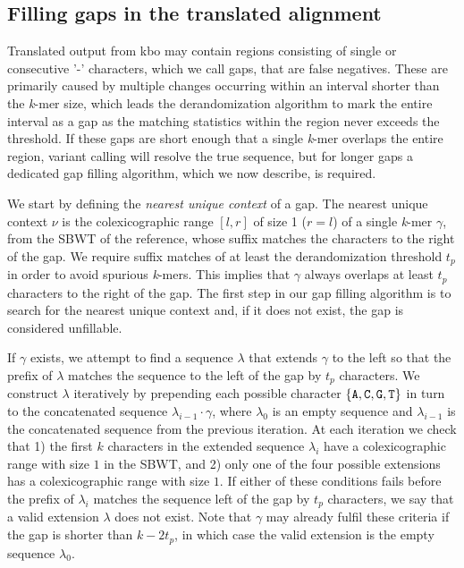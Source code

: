 \documentclass[unnumsec,webpdf,contemporary,large]{oup-authoring-template}%
\theoremstyle{thmstyleone}%
\theoremstyle{thmstyletwo}%
\theoremstyle{thmstylethree}%
\begin{document}
\subsection{Filling gaps in the translated alignment}
Translated output from {\sf kbo} may contain regions consisting of single or consecutive '-' characters, which we call gaps, that are false negatives. These are primarily caused by multiple changes occurring within an interval shorter than the \emph{k}-mer size, which leads the derandomization algorithm to mark the entire interval as a gap as the matching statistics within the region never exceeds the threshold. If these gaps are short enough that a single \emph{k}-mer overlaps the entire region, variant calling will resolve the true sequence, but for longer gaps a dedicated gap filling algorithm, which we now describe, is required.

We start by defining the \textit{nearest unique context} of a gap. %
The nearest unique context $\nu$ is the colexicographic range $\left[l,r\right]$ of size 1  ($r=l$) of a single \emph{k}-mer $\gamma$, from the SBWT of the reference, whose suffix matches the characters to the right of the gap. We require suffix matches of at least the derandomization threshold $t_p$ in order to avoid spurious \emph{k}-mers. This implies that $\gamma$ always overlaps at least $t_p$ characters to the right of the gap. The first step in our gap filling algorithm is to search for the nearest unique context and, if it does not exist, the gap is considered unfillable.

If $\gamma$ exists, we attempt to find a sequence $\lambda$ that extends $\gamma$ to the left so that the prefix of $\lambda$ matches the sequence to the left of the gap by $t_p$ characters. We construct $\lambda$ iteratively by prepending each possible character $\left\{ {\tt A,C,G,T}\right\}$ in turn to the concatenated sequence $\lambda_{i - 1} \cdot \gamma$, where $\lambda_0$ is an empty sequence and $\lambda_{i - 1}$ is the concatenated sequence from the previous iteration. At each iteration we check that 1) the first $k$ characters in the extended sequence $\lambda_i$ have a colexicographic range with size $1$ in the SBWT, and 2) only one of the four possible extensions has a colexicographic range with size $1$. If either of these conditions fails before the prefix of $\lambda_i$ matches the sequence left of the gap by $t_p$ characters, we say that a valid extension $\lambda$ does not exist. Note that $\gamma$ may already fulfil these criteria if the gap is shorter than $k - 2t_p$, in which case the valid extension is the empty sequence $\lambda_0$.
\end{document}
